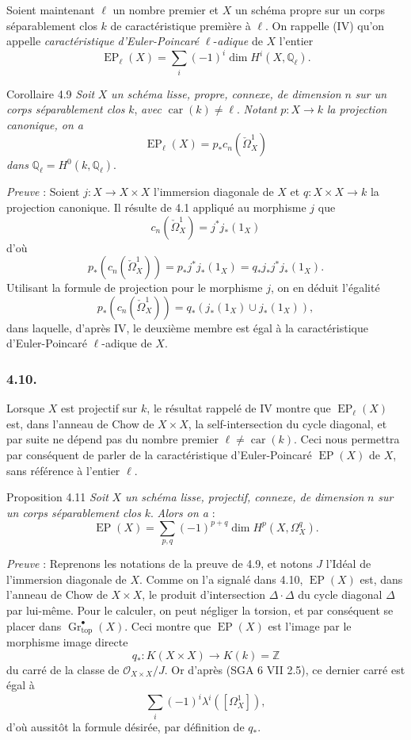 Soient maintenant $\ell$ un nombre premier et $X$ un schéma propre sur un corps séparablement clos $k$ de caractéristique première à $\ell$. On rappelle (IV) qu'on appelle \emph{caractéristique} \emph{d'Euler-Poincaré} $\ell$-\emph{adique} de $X$ l'entier
\[
\operatorname{EP}_\ell(X)=\sum_i(-1)^i\dim H^i(X,\mathbb{Q}_\ell).
\]

\begin{statement}{Corollaire 4.9}
\emph{Soit} $X$ \emph{un schéma lisse, propre, connexe, de dimension} $n$ \emph{sur un corps séparablement clos} $k$, \emph{avec} $\operatorname{car}(k)\ne\ell$. \emph{Notant} $p:X\to k$ \emph{la projection canonique, on a}
\[
\operatorname{EP}_\ell(X)=p_*c_n(\check\Omega^1_X)
\]
\emph{dans} $\mathbb{Q}_\ell=H^0(k,\mathbb{Q}_\ell)$.
\end{statement}

\emph{Preuve} : Soient $j:X\to X\times X$ l'immersion diagonale de $X$ et $q:X\times X\to k$ la projection canonique. Il résulte de 4.1 appliqué au morphisme $j$ que
\[
c_n(\check\Omega^1_X)=j^*j_*(1_X)
\]
d'où
\[
p_*(c_n(\check\Omega^1_X))=p_*j^*j_*(1_X)=q_*j_*j^*j_*(1_X).
\]
Utilisant la formule de projection pour le morphisme $j$, on en déduit l'égalité
\[
p_*(c_n(\check\Omega^1_X))=q_*(j_*(1_X)\cup j_*(1_X)),
\]
dans laquelle, d'après IV, le deuxième membre est égal à la caractéristique d'Euler-Poincaré $\ell$-adique de $X$.

\subsubsection*{4.10.}
Lorsque $X$ est projectif sur $k$, le résultat rappelé de IV montre que $\operatorname{EP}_\ell(X)$ est, dans l'anneau de Chow de $X\times X$, la self-intersection du cycle diagonal, et par suite ne dépend pas du nombre premier $\ell\ne\operatorname{car}(k)$. Ceci nous permettra par conséquent de parler de la caractéristique d'Euler-Poincaré $\operatorname{EP}(X)$ de $X$, sans référence à l'entier $\ell$.

\begin{statement}{Proposition 4.11}
\emph{Soit} $X$ \emph{un schéma lisse, projectif, connexe, de dimension} $n$ \emph{sur un corps séparablement clos} $k$. \emph{Alors on a} :
\[
\operatorname{EP}(X)=\sum_{p,q}(-1)^{p+q}\dim H^p(X,\Omega_X^q).
\]
\end{statement}

\emph{Preuve} : Reprenons les notations de la preuve de 4.9, et notons $J$ l'Idéal de l'immersion diagonale de $X$. Comme on l'a signalé dans 4.10, $\operatorname{EP}(X)$ est, dans l'anneau de Chow de $X\times X$, le produit d'intersection $\Delta\cdot\Delta$ du cycle diagonal $\Delta$ par lui-même. Pour le calculer, on peut négliger la torsion, et par conséquent se placer dans $\operatorname{Gr}_{\mathrm{top}}^\bullet(X)$. Ceci montre que $\operatorname{EP}(X)$ est l'image par le morphisme image directe
\[
q_*:K(X\times X)\to K(k)=\mathbb{Z}
\]
du carré de la classe de $\mathcal{O}_{X\times X}/J$. Or d'après (SGA 6 VII 2.5), ce dernier carré est égal à
\[
\sum_i(-1)^i\lambda^i([\Omega_X^1]),
\]
d'où aussitôt la formule désirée, par définition de $q_*$.

